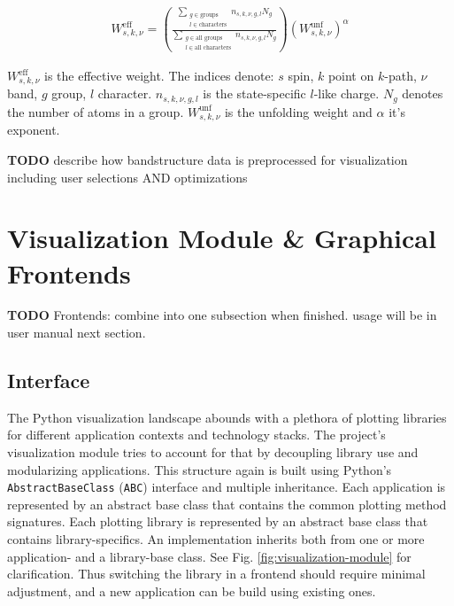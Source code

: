 \begin{align}
  W^{\text{eff}}_{s,k,\nu} = \left( \frac{\sum\limits_{\substack{g \in \text{groups} \\ l \in \text{characters}}} n_{s,k,\nu,g,l} N_g}{\sum\limits_{\substack{g \in \text{all groups} \\ l \in \text{all characters}}} n_{s,k,\nu,g,l} N_g} \right) \left(W_{s,k,\nu}^{\text{unf}}\right)^\alpha
\end{align}

\(W^{\text{eff}}_{s,k,\nu}\) is the effective weight. The indices denote: \(s\)
spin, \(k\) point on \(k\)-path, \(\nu\) band, \(g\) group, \(l\) character.
\(n_{s,k,\nu,g,l}\) is the state-specific \(l\)-like charge. \(N_g\) denotes the
number of atoms in a group. \(W_{s,k,\nu}^{\text{unf}}\) is the unfolding weight
and \(\alpha\) it's exponent.


\textbf{TODO} describe how bandstructure data is preprocessed for visualization
including user selections AND optimizations

\section{Visualization Module \& Graphical Frontends}
\label{sec:visualization-module}

\textbf{TODO} Frontends: combine into one subsection when finished. usage will
be in user manual next section.

\subsection{Interface}
\label{sec:visualization-interface}

The Python visualization landscape \cite{python-visualization} abounds with a
plethora of plotting libraries for different application contexts and technology
stacks. The project's visualization module tries to account for that by
decoupling library use and modularizing applications. This structure again is
built using Python's \texttt{AbstractBaseClass} (\texttt{ABC}) interface and
multiple inheritance. Each application is represented by an abstract base class
that contains the common plotting method signatures. Each plotting library is
represented by an abstract base class that contains library-specifics. An
implementation inherits both from one or more application- and a library-base
class. See Fig. \ref{fig:visualization-module} for clarification. Thus switching
the library in a frontend should require minimal adjustment, and a new
application can be build using existing ones.

